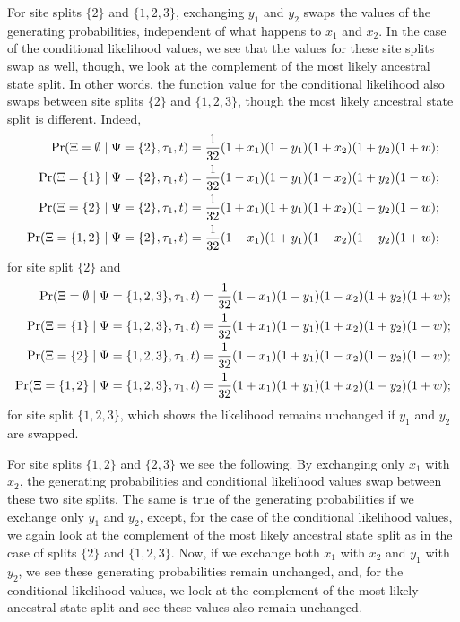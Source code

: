 For site splits $\{2\}$ and $\{1,2,3\}$, exchanging $y_1$ and $y_2$ swaps the values of the generating probabilities, independent of what happens to $x_1$ and $x_2$.
In the case of the conditional likelihood values, we see that the values for these site splits swap as well, though, we look at the complement of the most likely ancestral state split.
In other words, the function value for the conditional likelihood also swaps between site splits $\{2\}$ and $\{1,2,3\}$, though the most likely ancestral state split is different.
Indeed,
\begin{align*}
    \Pr(\Xi=\emptyset \mid \Psi=\{2\}, \tau_1, t) &= \frac{1}{32}(1+x_1)(1-y_1)(1+x_2)(1+y_2)(1+w);\\
    \Pr(\Xi=\{1\} \mid \Psi=\{2\}, \tau_1, t)     &= \frac{1}{32}(1-x_1)(1-y_1)(1-x_2)(1+y_2)(1-w);\\
    \Pr(\Xi=\{2\} \mid \Psi=\{2\}, \tau_1, t)     &= \frac{1}{32}(1+x_1)(1+y_1)(1+x_2)(1-y_2)(1-w);\\
    \Pr(\Xi=\{1,2\} \mid \Psi=\{2\}, \tau_1, t)   &= \frac{1}{32}(1-x_1)(1+y_1)(1-x_2)(1-y_2)(1+w);
\end{align*}
for site split $\{2\}$ and
\begin{align*}
    \Pr(\Xi=\emptyset \mid \Psi=\{1,2,3\}, \tau_1, t) &= \frac{1}{32}(1-x_1)(1-y_1)(1-x_2)(1+y_2)(1+w);\\
    \Pr(\Xi=\{1\} \mid \Psi=\{1,2,3\}, \tau_1, t)     &= \frac{1}{32}(1+x_1)(1-y_1)(1+x_2)(1+y_2)(1-w);\\
    \Pr(\Xi=\{2\} \mid \Psi=\{1,2,3\}, \tau_1, t)     &= \frac{1}{32}(1-x_1)(1+y_1)(1-x_2)(1-y_2)(1-w);\\
    \Pr(\Xi=\{1,2\} \mid \Psi=\{1,2,3\}, \tau_1, t)   &= \frac{1}{32}(1+x_1)(1+y_1)(1+x_2)(1-y_2)(1+w);
\end{align*}
for site split $\{1,2,3\}$, which shows the likelihood remains unchanged if $y_1$ and $y_2$ are swapped.

For site splits $\{1,2\}$ and $\{2,3\}$ we see the following.
By exchanging only $x_1$ with $x_2$, the generating probabilities and conditional likelihood values swap between these two site splits.
The same is true of the generating probabilities if we exchange only $y_1$ and $y_2$, except, for the case of the conditional likelihood values, we again look at the complement of the most likely ancestral state split as in the case of splits $\{2\}$ and $\{1,2,3\}$.
Now, if we exchange both $x_1$ with $x_2$ and $y_1$ with $y_2$, we see these generating probabilities remain unchanged, and, for the conditional likelihood values, we look at the complement of the most likely ancestral state split and see these values also remain unchanged.

